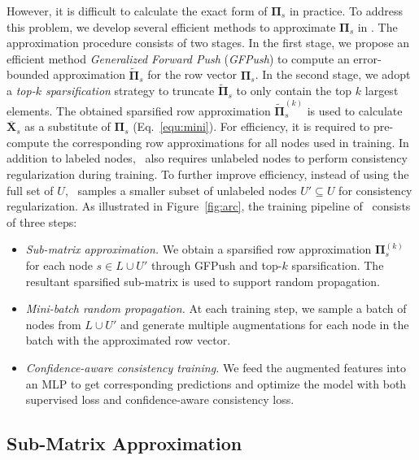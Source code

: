 However, it is difficult to calculate the exact form of $\mathbf{\Pi}_s$ in practice. 
To address this problem, we develop several efficient methods to approximate $\mathbf{\Pi}_s$ in \model. 
The approximation procedure consists of two stages. 
In the first stage, we propose an efficient method \textit{Generalized Forward Push} (\textit{GFPush}) to compute an error-bounded approximation $\widetilde{\mathbf{\Pi}}_s$ for the row vector $\mathbf{\Pi}_s$. 
In the second stage, we adopt a \textit{top-$k$ sparsification} strategy to truncate $\widetilde{\mathbf{\Pi}}_s$ to only contain the top $k$ largest elements. 
The obtained sparsified row approximation $\widetilde{\mathbf{\Pi}}^{(k)}_s$ is used to calculate $\overline{\mathbf{X}}_s$ as a substitute of $\mathbf{\Pi}_s$ (Eq.~\ref{equ:mini}). 
For efficiency, it is required to pre-compute the corresponding row approximations for all nodes used in training.
In addition to labeled nodes,
\model\ also requires unlabeled nodes to perform consistency regularization during training. 
 To further improve efficiency, instead of using the full set of  $U$,  \model\ samples a smaller subset of unlabeled nodes $U'\subseteq U$ for consistency regularization.
As illustrated in Figure~\ref{fig:arc}, the training pipeline of \model\ consists of three steps:
\begin{itemize}
    \item \textit{Sub-matrix approximation.} 
    We obtain a sparsified row approximation $\mathbf{\Pi}^{(k)}_s$ for each node $s \in L \cup U'$ through GFPush and top-$k$ sparsification. 
    The resultant sparsified sub-matrix is used to support random propagation. 
    \item \textit{Mini-batch random propagation.} 
    At each training step, we sample a batch of nodes from $L \cup U'$ and generate multiple augmentations for each node in the batch with the approximated row vector.
    \item \textit{Confidence-aware consistency training.} 
    We feed the augmented features into an MLP to get corresponding predictions and optimize the model with both supervised loss and confidence-aware consistency loss.
\end{itemize}













\subsection{Sub-Matrix Approximation}


